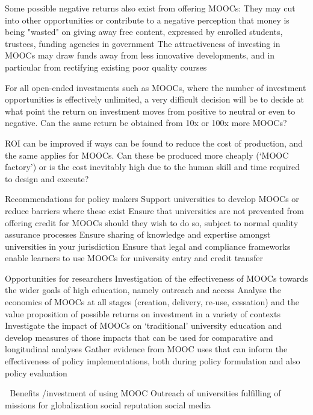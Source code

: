 Some possible negative returns also exist from offering MOOCs: They may
cut into other opportunities or contribute to a negative perception that
money is being "wasted" on giving away free content, expressed by
enrolled students, trustees, funding agencies in government The
attractiveness of investing in MOOCs may draw funds away from less
innovative developments, and in particular from rectifying existing poor
quality courses
 
 
For all open-ended investments such as MOOCs, where the number of
investment opportunities is effectively unlimited, a very difficult
decision will be to decide at what point the return on investment moves
from positive to neutral or even to negative.  Can the same return be
obtained from 10x or 100x more MOOCs?
 
ROI can be improved if ways can be found to reduce the cost of
production, and the same applies for MOOCs.  Can these be produced more
cheaply (‘MOOC factory’) or is the cost inevitably high due to the human
skill and time required to design and execute?
 
Recommendations for policy makers Support universities to develop MOOCs
or reduce barriers where these exist Ensure that universities are not
prevented from offering credit for MOOCs should they wish to do so,
subject to normal quality assurance processes Ensure sharing of
knowledge and expertise amongst universities in your jurisdiction Ensure
that legal and compliance frameworks enable learners to use MOOCs for
university entry and credit transfer
 
 
 
 
Opportunities for researchers Investigation of the effectiveness of
MOOCs towards the wider goals of high education, namely outreach and
access Analyse the economics of MOOCs at all stages (creation, delivery,
re-use, cessation) and the value proposition of possible returns on
investment in a variety of contexts Investigate the impact of MOOCs on
‘traditional’ university education and develop measures of those impacts
that can be used for comparative and longitudinal analyses Gather
evidence from MOOC uses that can inform the effectiveness of policy
implementations, both during policy formulation and also policy
evaluation
 
 
 
 


Benefits /investment of using MOOC Outreach of universities fulfilling
of missions for globalization social reputation social media

